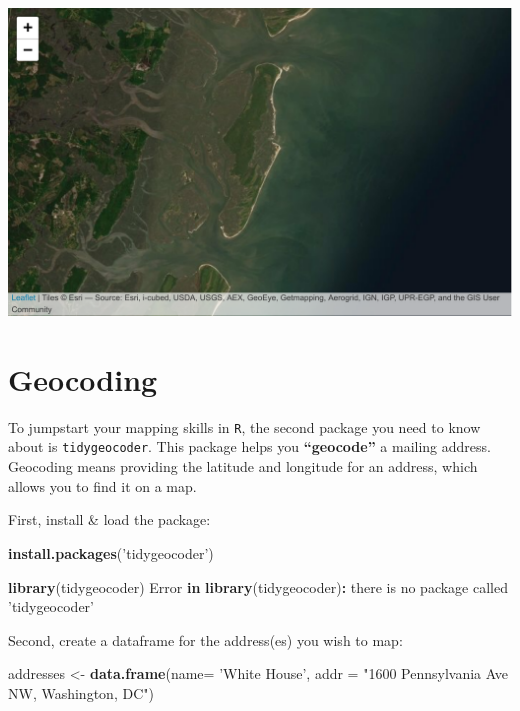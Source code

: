 \documentclass[]{book}
\newenvironment{Shaded}{\begin{snugshade}}{\end{snugshade}}
\newcommand{\ControlFlowTok}[1]{\textcolor[rgb]{0.13,0.29,0.53}{\textbf{#1}}}
\newcommand{\DataTypeTok}[1]{\textcolor[rgb]{0.13,0.29,0.53}{#1}}
\newcommand{\KeywordTok}[1]{\textcolor[rgb]{0.13,0.29,0.53}{\textbf{#1}}}
\newcommand{\NormalTok}[1]{#1}
\newcommand{\OperatorTok}[1]{\textcolor[rgb]{0.81,0.36,0.00}{\textbf{#1}}}
\newcommand{\StringTok}[1]{\textcolor[rgb]{0.31,0.60,0.02}{#1}}
\begin{document}
\includegraphics{figures/unnamed-chunk-394-1.pdf}

\hypertarget{geocoding}{%
\section*{Geocoding}\label{geocoding}}

To jumpstart your mapping skills in \texttt{R}, the second package you need to know about is \texttt{tidygeocoder}. This package helps you \textbf{``geocode''} a mailing address. Geocoding means providing the latitude and longitude for an address, which allows you to find it on a map.

First, install \& load the package:

\begin{Shaded}
\begin{Highlighting}[]
\KeywordTok{install.packages}\NormalTok{(}\StringTok{'tidygeocoder'}\NormalTok{)}
\end{Highlighting}
\end{Shaded}

\begin{Shaded}
\begin{Highlighting}[]
\KeywordTok{library}\NormalTok{(tidygeocoder)}
\NormalTok{Error }\ControlFlowTok{in} \KeywordTok{library}\NormalTok{(tidygeocoder)}\OperatorTok{:}\StringTok{ }\NormalTok{there is no package called }\StringTok{'tidygeocoder'}
\end{Highlighting}
\end{Shaded}

Second, create a dataframe for the address(es) you wish to map:

\begin{Shaded}
\begin{Highlighting}[]
\NormalTok{addresses <-}\StringTok{ }\KeywordTok{data.frame}\NormalTok{(}\DataTypeTok{name=} \StringTok{'White House'}\NormalTok{, }
                        \DataTypeTok{addr =} \StringTok{"1600 Pennsylvania Ave NW, Washington, DC"}\NormalTok{)}
\end{Highlighting}
\end{Shaded}
\end{document}
